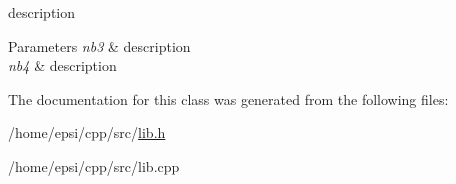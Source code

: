description 


\begin{DoxyParams}{Parameters}
{\em nb3} & description \\
\hline
{\em nb4} & description \\
\hline
\end{DoxyParams}


The documentation for this class was generated from the following files\+:\begin{DoxyCompactItemize}
\item 
/home/epsi/cpp/src/\hyperlink{lib_8h}{lib.\+h}\item 
/home/epsi/cpp/src/lib.\+cpp\end{DoxyCompactItemize}
